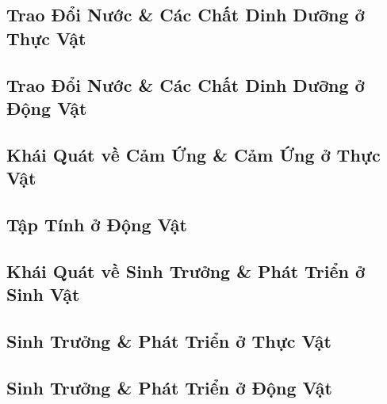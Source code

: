 \documentclass{article}
\numberwithin{equation}{section}
\begin{document}
\subsection{Trao Đổi Nước \& Các Chất Dinh Dưỡng ở Thực Vật}


\subsection{Trao Đổi Nước \& Các Chất Dinh Dưỡng ở Động Vật}


\subsection{Khái Quát về Cảm Ứng \& Cảm Ứng ở Thực Vật}


\subsection{Tập Tính ở Động Vật}


\subsection{Khái Quát về Sinh Trưởng \& Phát Triển ở Sinh Vật}


\subsection{Sinh Trưởng \& Phát Triển ở Thực Vật}


\subsection{Sinh Trưởng \& Phát Triển ở Động Vật}

\end{document}
